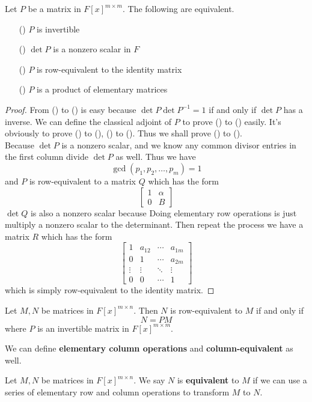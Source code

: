 \documentclass{article}
\begin{document}
\begin{thm}
	Let $P$ be a matrix in $F[x]^{m\times m}$. The following are equivalent.
	\begin{enumerate}
		\item [(\romannumeral1)]$P$ is invertible
		\item [(\romannumeral2)]$\det P$ is a nonzero scalar in $F$
		\item [(\romannumeral3)]$P$ is row-equivalent to the identity matrix
		\item [(\romannumeral4)]$P$ is a product of elementary matrices
	\end{enumerate}
\end{thm}
\begin{proof}
	From () to () is easy because $\det P\det P^{-1}=1$ if and only if $\det P$ has a inverse. We can define the classical adjoint of $P$ to prove () to () easily. It's obviously to prove () to (), () to (). Thus we shall prove () to ().\\
	Because $\det P$ is a nonzero scalar, and we know any common divisor entries in the first column divide $\det P$ as well. Thus we have
	\[\gcd(p_1,p_2,\dots,p_m)=1\]
	and $P$ is row-equivalent to a matrix $Q$ which has the form
	\[\begin{bmatrix}
		1&\alpha\\
		0&B
	\end{bmatrix}\]
	$\det Q$ is also a nonzero scalar because Doing elementary row operations is just multiply a nonzero scalar to the determinant. Then repeat the process we have a matrix $R$ which has the form
	\[\begin{bmatrix}
		1&a_{12}&\cdots&a_{1m}\\
		0&1&\cdots&a_{2m}\\
		\vdots&\vdots&\ddots&\vdots\\
		0&0&\cdots&1
	\end{bmatrix}\]
	which is simply row-equivalent to the identity matrix.
\end{proof}
\begin{coro}
	Let $M,N$ be matrices in $F[x]^{m\times n}$. Then $N$ is row-equivalent to $M$ if and only if 
	\[N=PM\]
	where $P$ is an invertible matrix in $F[x]^{m\times m}$.
\end{coro}
We can define \textbf{elementary column operations} and \textbf{column-equivalent} as well.
\begin{dde}
	Let $M,N$ be matrices in $F[x]^{m\times n}$. We say $N$ is \textbf{equivalent} to $M$ if we can use a series of elementary row and column operations to transform $M$ to $N$. 
\end{dde}
\end{document}
